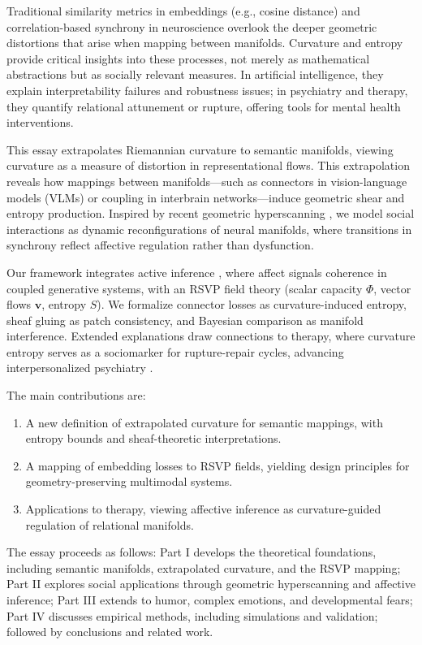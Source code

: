 \documentclass{article}
\theoremstyle{definition}
\begin{document}
Traditional similarity metrics in embeddings (e.g., cosine distance) and correlation-based synchrony in neuroscience overlook the deeper geometric distortions that arise when mapping between manifolds. Curvature and entropy provide critical insights into these processes, not merely as mathematical abstractions but as socially relevant measures. In artificial intelligence, they explain interpretability failures and robustness issues; in psychiatry and therapy, they quantify relational attunement or rupture, offering tools for mental health interventions.

This essay extrapolates Riemannian curvature to semantic manifolds, viewing curvature as a measure of distortion in representational flows. This extrapolation reveals how mappings between manifolds—such as connectors in vision-language models (VLMs) or coupling in interbrain networks—induce geometric shear and entropy production. Inspired by recent geometric hyperscanning \citep{hinrichs2025geometry}, we model social interactions as dynamic reconfigurations of neural manifolds, where transitions in synchrony reflect affective regulation rather than dysfunction.

Our framework integrates active inference \citep{friston2017graphical}, where affect signals coherence in coupled generative systems, with an RSVP field theory (scalar capacity $\Phi$, vector flows $\mathbf{v}$, entropy $S$). We formalize connector losses as curvature-induced entropy, sheaf gluing as patch consistency, and Bayesian comparison as manifold interference. Extended explanations draw connections to therapy, where curvature entropy serves as a sociomarker for rupture-repair cycles, advancing interpersonalized psychiatry \citep{adel2025systematic}.

The main contributions are:
\begin{enumerate}
  \item A new definition of extrapolated curvature for semantic mappings, with entropy bounds and sheaf-theoretic interpretations.
  \item A mapping of embedding losses to RSVP fields, yielding design principles for geometry-preserving multimodal systems.
  \item Applications to therapy, viewing affective inference as curvature-guided regulation of relational manifolds.
\end{enumerate}

The essay proceeds as follows: Part I develops the theoretical foundations, including semantic manifolds, extrapolated curvature, and the RSVP mapping; Part II explores social applications through geometric hyperscanning and affective inference; Part III extends to humor, complex emotions, and developmental fears; Part IV discusses empirical methods, including simulations and validation; followed by conclusions and related work.
\end{document}
